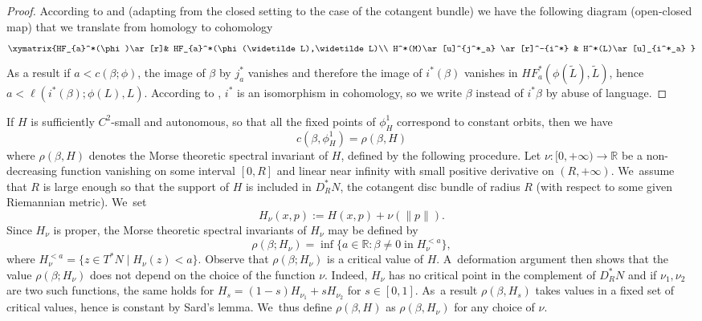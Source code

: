 \documentclass[JEP,XML,SOM,Unicode,NoFloatCountersInSection,published]{cedram}
\theoremstyle{definition}
\newcommand{\R}{\mathbb{R}}
\begin{document}
\begin{proof}
According to \cite[Th.\,1.5]{Albers-PSS} and \cite[Proof of Prop.\,2.9]{M-V-Z} (adapting from the closed setting to the case of the cotangent bundle) we have the following diagram (open-closed map) that we translate from homology to cohomology
\[
\xymatrix{HF_{a}^*(\phi)\ar[r]& HF_{a}^*(\phi(\widetilde L),\widetilde L)\\
H^*(M)\ar[u]^{j^*_a} \ar[r]^-{i^*} & H^*(L)\ar[u]_{i^*_a}
}
\]
As a result if $a< c(\beta;\phi)$, the image of $\beta$ by $j_a^*$ vanishes and therefore the image of $i^*(\beta)$
vanishes in $HF_{a}^*(\phi(\widetilde{L}),\widetilde{L})$, hence $a < \ell (i^*(\beta);\phi(L),L)$. According to \cite{Fukaya-Seidel-Smith, Kragh2}, $i^*$ is an isomorphism in cohomology, so we write $\beta$ instead of $i^*\beta$ by abuse of language.
\end{proof}

If $H$ is sufficiently $C^2$-small and autonomous, so that all the fixed points of $\phi_H^1$ correspond to constant orbits, then we have
\begin{equation}
\label{eq:spectral-morse}
c(\beta, \phi_H^1)=\rho(\beta, H)
\end{equation}
where $\rho(\beta, H)$ denotes the Morse theoretic spectral invariant of $H$, defined by the following procedure.
Let $\nu:[0, +\infty)\to\R$ be a non-decreasing function vanishing on some interval $[0,R]$ and linear near infinity with small positive derivative on $(R,+\infty)$. We~assume that $R$ is large enough so that the support of $H$ is included in $D_R^*N$, the cotangent disc bundle of radius $R$ (with respect to some given Riemannian metric). We~set\vspace*{-3pt}
\begin{equation}
\label{eq:H_nu}
H_\nu(x,p):=H(x,p)+\nu(\|p\|).
\end{equation}
Since $H_\nu$ is proper, the Morse theoretic spectral invariants of $H_\nu$ may be defined by\vspace*{-3pt}
\[
\rho(\beta;H_\nu)=\inf\bigl\{a\in\R: \beta \neq 0 \; \text{in}\; H_\nu^{<a} \bigr\},
\]
where $H_\nu^{<a}=\{z \in T^*N \mid H_\nu(z)<a\}$.
Observe that $\rho(\beta;H_\nu)$ is a critical value of $H$. A~deformation argument then shows that the value $\rho(\beta;H_\nu)$ does not depend on the choice of the function $\nu$. Indeed, $H_\nu$ has no critical point in the complement of $D_R^*N$ and if $\nu_1,\nu_2$ are two such functions, the same holds for $H_s=(1-s)H_{\nu_1}+s H_{\nu_2}$ for $s\in[0,1]$. As~a result $\rho(\beta,H_s)$ takes values in a fixed set of critical values, hence is constant by Sard's lemma. We~thus define $\rho(\beta, H)$ as $\rho(\beta, H_\nu)$ for any choice of $\nu$.
\end{document}
